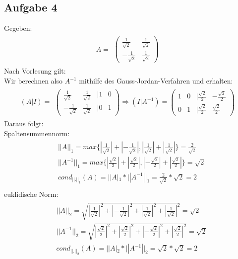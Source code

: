 \newpage
\subsection*{Aufgabe 4}
Gegeben:
\begin{align*} \label{eq8}
A=
\begin{split}
\begin{pmatrix}
\frac{1}{\sqrt2} & \frac{1}{\sqrt2} \\
-\frac{1}{\sqrt2} &\frac{1}{\sqrt2}
\end{pmatrix}
\end{split}
\end{align*}
Nach Vorlesung gilt: \\

Wir berechnen also $A^{-1}$ mithilfe des Gauss-Jordan-Verfahren und erhalten:
\begin{align*}
(A|I)=
\begin{split}
\begin{pmatrix}
\frac{1}{\sqrt2} & \frac{1}{\sqrt2} & |1 & 0 \\
-\frac{1}{\sqrt2} &\frac{1}{\sqrt2} & |0 & 1
\end{pmatrix}
\Rightarrow(I|A^{-1})=
\begin{pmatrix}
 1 & 0 & |\frac{\sqrt2}{2} & -\frac{\sqrt2}{2} \\
 0 & 1 & |\frac{\sqrt2}{2} & \frac{\sqrt2}{2}
\end{pmatrix}
\end{split}
\end{align*}
Daraus folgt:\\
Spaltensummennorm:
\begin{align*}
\begin{split}
&||A||_1=max\{|\frac{1}{\sqrt2}|+|-\frac{1}{\sqrt2}|, |\frac{1}{\sqrt2}|+|\frac{1}{\sqrt2}|\}=\frac{2}{\sqrt2}\\
&||A^{-1}||_1=max\{|\frac{\sqrt2}{2}|+|\frac{\sqrt2}{2}|, |-\frac{\sqrt2}{2}|+|\frac{\sqrt2}{2}|\}={\sqrt2}\\
& cond_{||.||_1}(A)=||A|_1*||A^{-1}||_1=\frac{2}{\sqrt2} * {\sqrt2} = 2\\
\end{split}
\end{align*}
euklidische Norm:
\begin{align*}
\begin{split}
&||A||_2=\sqrt{|\frac{1}{\sqrt2}|^2+|-\frac{1}{\sqrt2}|^2+|\frac{1}{\sqrt2}|^2+|\frac{1}{\sqrt2}|^2}=\sqrt{2}\\
&||A^{-1}||_2=\sqrt{|\frac{\sqrt2}{2}|^2+|\frac{\sqrt2}{2}|^2 + |-\frac{\sqrt2}{2}|^2 +|\frac{\sqrt2}{2}|^2}=\sqrt{2}\\
& cond_{||.||_2}(A)=||A|_2*||A^{-1}||_2=\sqrt{2}*\sqrt{2}=2\\
\end{split}
\end{align*}
